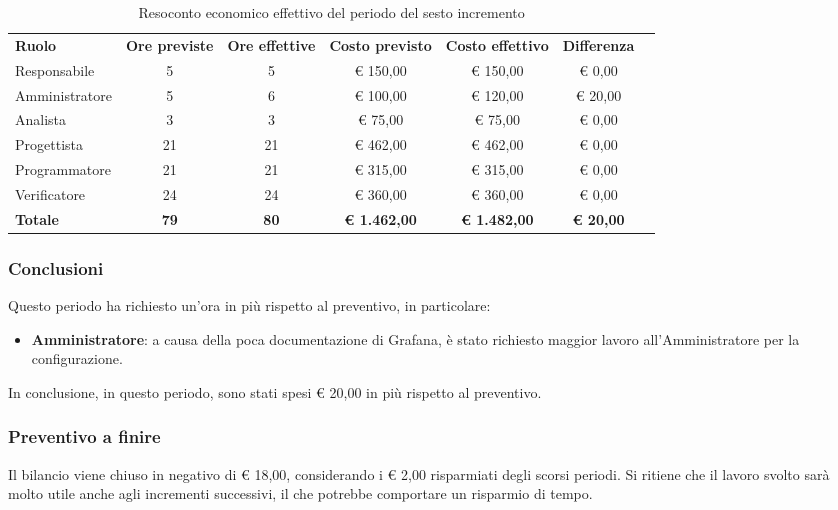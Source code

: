\documentclass[../piano-di-progetto.tex]{subfiles}
\begin{document}
  \begin{table}[H]
    \centering
    \begin{tabular}{lcccccc}
      \rowcolor{lightgray}
      \textbf{Ruolo}  & \textbf{Ore previste} & \textbf{Ore effettive} & \textbf{Costo previsto} & \textbf{Costo effettivo} & \textbf{Differenza} \\
Responsabile    & 5           & 5           & € 150,00            & € 150,00            & € 0,00           \\
Amministratore  & 5           & 6           & € 100,00            & € 120,00            & € 20,00          \\
Analista        & 3           & 3           & € 75,00             & € 75,00             & € 0,00           \\
Progettista     & 21          & 21          & € 462,00            & € 462,00            & € 0,00           \\
Programmatore   & 21          & 21          & € 315,00            & € 315,00            & € 0,00           \\
Verificatore    & 24          & 24          & € 360,00            & € 360,00            & € 0,00           \\
\textbf{Totale} & \textbf{79} & \textbf{80} & \textbf{€ 1.462,00} & \textbf{€ 1.482,00} & \textbf{€ 20,00}
    \end{tabular}
    \caption{Resoconto economico effettivo del periodo del sesto incremento}
  \end{table}


\subsubsection{Conclusioni}
Questo periodo ha richiesto un'ora in più rispetto al preventivo, in particolare:
\begin{itemize}
    \item \textbf{Amministratore}: a causa della poca documentazione di Grafana, è stato richiesto maggior lavoro all'Amministratore per la configurazione.
\end{itemize}
In conclusione, in questo periodo, sono stati spesi € 20,00 in più rispetto al preventivo.

\subsubsection{Preventivo a finire}
Il bilancio viene chiuso in negativo di € 18,00, considerando i € 2,00 risparmiati degli scorsi periodi. Si ritiene che il lavoro svolto sarà molto utile anche agli incrementi successivi, il che potrebbe comportare un risparmio di tempo.
\end{document}
